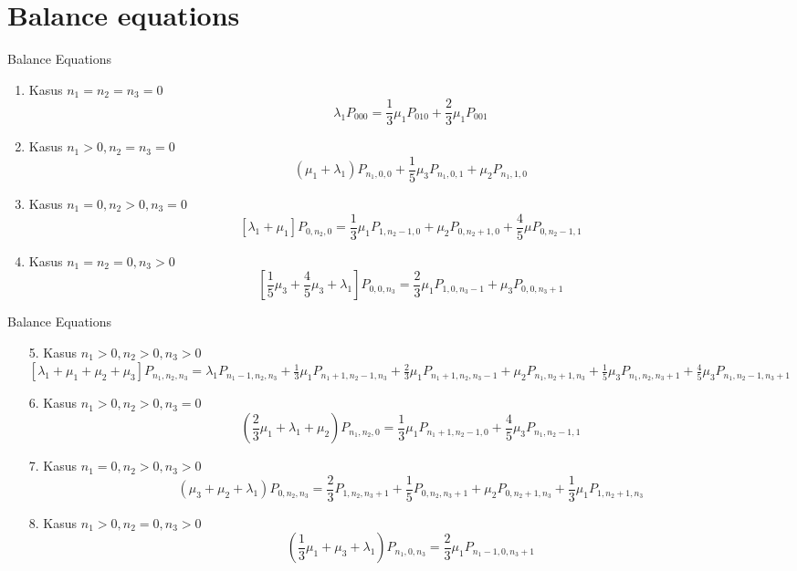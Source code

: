 \documentclass[aspectratio=169]{beamer}
\begin{document}
\section{\color{mygreen}\huge Balance equations}
\begin{frame}{Balance Equations}
    \begin{enumerate}
        \item Kasus $n_{1}=n_{2}=n_{3}=0$\
        $$\lambda_{1}P_{000}=\frac{1}{3}\mu_{1}P_{010}+\frac{2}{3}\mu_{1}P_{001}$$
        \item Kasus $n_{1}> 0 , n_{2}=n_{3}=0$\
        $$(\mu_1 + \lambda_1)P_{n_1, 0, 0} + \frac{1}{5}\mu_3 P_{n_1, 0, 1} + \mu_2 P_{n_1, 1, 0}$$
        \item Kasus $n_{1}=0, n_{2}>0 , n_{3}=0$\   $$[\lambda_{1}+\mu_{1}]P_{0,n_{2},0}=\frac{1}{3}\mu_{1}P_{1,n_{2}-1,0}+\mu_{2}P_{0,n_{2}+1,0}+\frac{4}{5}\mu P_{0,n_{2}-1,1}$$
        \item Kasus $n_{1}=n_{2}=0 , n_{3}>0$\
        $$[\frac{1}{5}\mu_{3}+\frac{4}{5}\mu_{3}+\lambda_{1}]P_{0,0,n_{3}}=\frac{2}{3}\mu_{1}P_{1,0,n_{3}-1}+\mu_{3}P_{0,0,n_{3}+1}$$
        
\end{enumerate}
\end{frame}
    \begin{frame}{Balance Equations}
    \begin{enumerate}
        \item [5.] Kasus $n_{1}>0 , n_{2} > 0, n_{3} > 0$\\
        $[\lambda_{1}+\mu_{1}+\mu_{2}+\mu_{3}]P_{n_{1},n_{2},n_{3}}=\lambda_{1}P_{n_{1}-1,n_{2},n_{3}}+\frac{1}{3}\mu_{1}P_{n_{1}+1,n_{2}-1,n_{3}}+\frac{2}{3}\mu_{1}P_{n_{1}+1,n_{2},n_{3}-1}+\mu_{2}P_{n_{1},n_{2}+1,n_{3}}+\frac{1}{5}\mu_{3}P_{n_{1},n_{2},n_{3}+1}+\frac{4}{5}\mu_{3}P_{n_{1},n_{2}-1,n_{3}+1}$
        \item [6.] Kasus $n_{1}>0 , n_{2}>0 , n_{3}=0$
        $$(\frac{2}{3}\mu_1 + \lambda_1 + \mu_2)P_{n_1, n_2, 0} = \frac{1}{3} \mu_1 P_{n_1 +1, n_2 -1, 0} + \frac{4}{5}\mu_3 P_{n_1, n_2 - 1, 1}$$
        \item [7.] Kasus $n_{1}=0 , n_{2}>0 , n_{3}>0$
        $$(\mu_3 + \mu_2 + \lambda_1)P_{0, n_2, n_3} = \frac{2}{3}P_{1, n_2, n_3 + 1} + \frac{1}{5}P_{0, n_2, n_3 + 1} + \mu_2 P_{0, n_2 + 1, n_3} + \frac{1}{3} \mu_1 P_{1, n_2 + 1, n_3}$$
        \item [8.] Kasus $n_{1}>0, n_{2}=0, n_{3}>0$
        $$(\frac{1}{3}\mu_1 + \mu_3 + \lambda_1)P_{n_1, 0, n_3} = \frac{2}{3}\mu_1 P_{n_1 - 1, 0, n_3 + 1}$$
    \end{enumerate}
    \end{frame}
        
\end{document}
